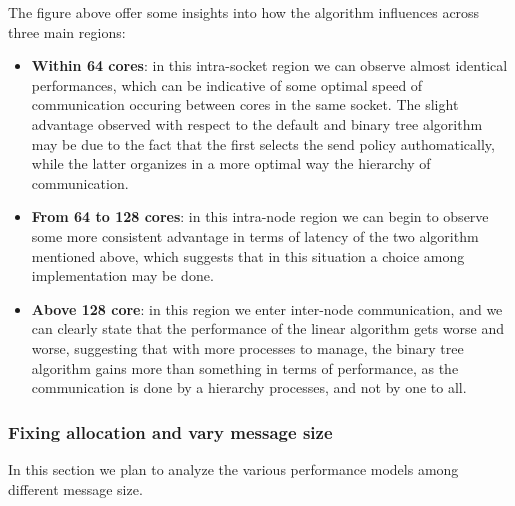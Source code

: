 \documentclass{article}
\begin{document}
	
	The figure above offer some insights into how the algorithm influences across three main regions:
	
	\begin{itemize}
		\item \textbf{Within 64 cores}: in this intra-socket region we can observe almost identical performances, which can be indicative of some optimal speed of communication occuring between cores in the same socket. The slight advantage observed with respect to the default and binary tree algorithm may be due to the fact that the first selects the send policy authomatically, while the latter organizes in a more optimal way the hierarchy of communication.\\
		\item \textbf{From 64 to 128 cores}: in this intra-node region we can begin to observe some more consistent advantage in terms of latency of the two algorithm mentioned above, which suggests that in this situation a choice among implementation may be done.
		\item \textbf{Above 128 core}: in this region we enter inter-node communication, and we can clearly state that the performance of the linear algorithm gets worse and worse, suggesting that with more processes to manage, the binary tree algorithm gains more than something in terms of performance, as the communication is done by a hierarchy processes, and not by one to all.
	\end{itemize}

	\subsubsection{Fixing allocation and vary message size}
	
	In this section we plan to analyze the various performance models among different message size.
	
\end{document}
